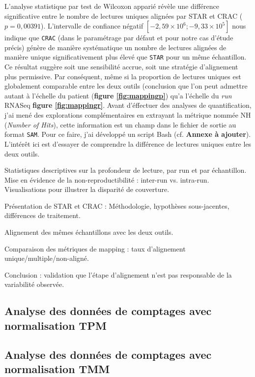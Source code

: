 L'analyse statistique par test de Wilcoxon apparié révèle une différence significative entre le nombre de lectures uniques alignées par STAR et CRAC (\( p = 0{,}00391 \)). L'intervalle de confiance négatif \([-2{,}59 \times 10^{6} ; -9{,}33 \times 10^{5}]\) nous indique que \texttt{CRAC} (dans le paramétrage par défaut et pour notre cas d'étude précis) génère de manière systématique un nombre de lectures alignées de manière unique significativement plus élevé que \texttt{STAR} pour un même échantillon. Ce résultat suggère soit une sensibilité accrue, soit une stratégie d’alignement plus permissive. Par conséquent, même si la proportion de lectures uniques est  globalement comparable entre les deux outils (conclusion que l'on peut admettre autant à l'échelle du patient (\textbf{figure \ref{fig:mappingp}}) qu'a l'échelle du \textit{run} RNASeq \textbf{figure \ref{fig:mappingr}}. Avant d'éffectuer des analyses de quantification, j’ai mené des explorations complémentaires en extrayant la métrique nommée \og NH \fg (\textit{Number of Hits}), cette information est un champ dans le fichier de sortie au format \texttt{SAM}. Pour ce faire, j’ai développé un script Bash (cf. \textbf{Annexe à ajouter}). L'intérêt ici est d'essayer de comprendre la différence de lectures uniques entre les deux outils. 



    Statistiques descriptives sur la profondeur de lecture, par run et par échantillon.
    Mise en évidence de la non-reproductibilité : inter-run vs. intra-run.
    Visualisations pour illustrer la disparité de couverture.

    Présentation de STAR et CRAC :
    Méthodologie, hypothèses sous-jacentes, différences de traitement.

    Alignement des mêmes échantillons avec les deux outils.

    Comparaison des métriques de mapping : taux d’alignement unique/multiple/non-aligné.

    Conclusion : validation que l’étape d’alignement n’est pas responsable de la variabilité observée.


\subsection{Analyse des données de comptages avec normalisation TPM}



\subsection{Analyse des données de comptages avec normalisation TMM}

